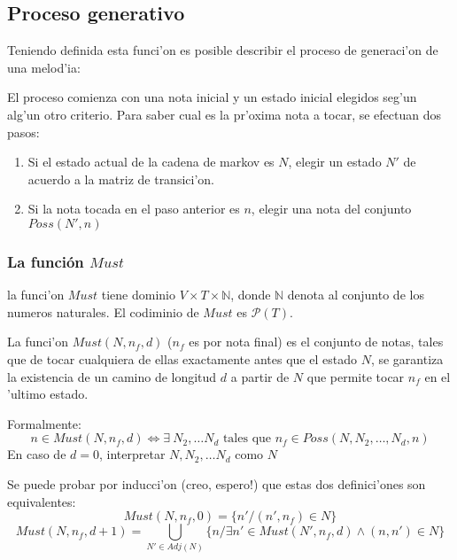\subsection{Proceso generativo}
Teniendo definida esta funci'on es posible describir el proceso de generaci'on de una melod'ia:

El proceso comienza con una nota inicial y un estado inicial elegidos seg'un alg'un otro criterio. 
Para saber cual es la pr'oxima nota a tocar, se efectuan dos pasos:
\begin{enumerate}
 \item Si el estado actual de la cadena de markov es $N$, elegir un estado $N'$ de acuerdo a la matriz de transici'on.
 \item Si la nota tocada en el paso anterior es $n$, elegir una nota del conjunto $Poss(N', n)$
\end{enumerate}


\subsubsection{La funci\'on $Must$}
la funci'on $Must$ tiene dominio $V \times T \times \mathbb{N}$, donde $\mathbb{N}$ denota al conjunto de los numeros naturales.
El codiminio de $Must$ es $\mathcal{P}(T)$.

La funci'on $Must(N, n_f, d)$ ($n_f$ es por nota final) es el conjunto de notas, tales que de tocar cualquiera de ellas
exactamente antes que el estado $N$, se garantiza la existencia de un camino de longitud $d$ a partir de $N$ que permite tocar
$n_f$ en el 'ultimo estado.

Formalmente:
$$n \in Must(N, n_f, d) \Leftrightarrow \exists\ N_2, \dots N_d \text{ tales que } n_f \in Poss(N, N_2, \dots, N_d, n) $$ 
En caso de $d=0$, interpretar $N, N_2, \dots N_d$ como $N$
 
Se puede probar por inducci'on (creo, espero!) que estas dos definici'ones son equivalentes:
$$Must(N, n_f, 0)= \{n' / (n', n_f) \in N\}$$
$$Must(N, n_f, d+1) = \bigcup_{N' \in Adj(N)}\{n / \exists n' \in Must(N', n_f, d) \land (n, n') \in N \}$$


